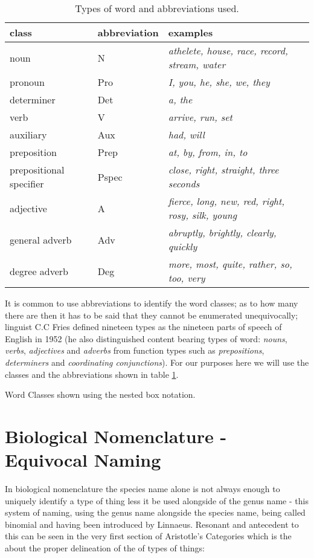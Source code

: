 \begin{table}[h]
\begin{tabular} {l l l}
class        &  abbreviation & examples \\
\hline
noun           &  N     & \textit{athelete, house, race, record, stream, water}\\
pronoun        &  Pro   & \textit{I, you, he, she, we, they} \\
determiner     &  Det   & \textit{a, the} \\
verb           &  V     & \textit{arrive, run, set}\\
auxiliary      &  Aux   & \textit{had, will} \\
preposition    &  Prep  & \textit{at, by, from, in, to} \\
prepositional specifier & Pspec & \textit{close, right, straight, three seconds} \\
adjective      &  A     & \textit{fierce, long, new, red, right, rosy, silk, young}\\
general adverb &  Adv   & \textit{abruptly, brightly, clearly, quickly}\\
degree adverb  &  Deg   & \textit{ more, most, quite, rather, so, too, very} \\ 
\end{tabular}
\caption{Types of word and abbreviations used.}
\label {tableofwordtypes}
\end{table} 

\noindent It is common to use abbreviations to identify the word classes; as to how many there are then it has to be said that they cannot be enumerated unequivocally; linguist C.C Fries defined nineteen types as the nineteen parts of speech of English in 1952 (he also distinguished content bearing types of word: \textit{nouns}, \textit{verbs}, \textit{adjectives} and \textit{adverbs} from function types such as 
\textit{prepositions}, \textit{determiners} and \textit{coordinating conjunctions}). For our purposes here we will use the classes and the abbreviations shown in table \ref{tableofwordtypes}. 

 {Word Classes shown using the nested box notation. }


\section{Biological Nomenclature - Equivocal Naming}
\noindent In biological nomenclature the species name alone is not always enough to uniquely identify a type of thing less it be used alongside of the genus name - this system of naming, using the genus name alongside the species name, being called binomial and having been introduced by Linnaeus. Resonant and antecedent to this can be seen in the very first section of Aristotle's Categories which is the about the proper delineation of the of types of things: \\

